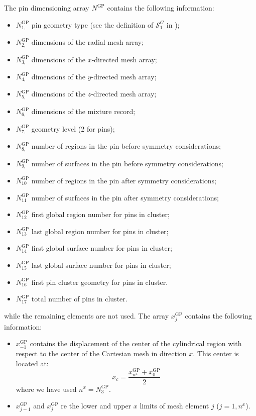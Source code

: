 The pin dimensioning array $N^{\text{GP}}$ contains the following information:
\begin{itemize}
\item $N^{\text{GP}}_{1,}$ pin geometry type (see the definition of $\mathcal{S}^{G}_{1}$ in );
\item $N^{\text{GP}}_{2,}$ dimensions of the radial mesh array;
\item $N^{\text{GP}}_{3,}$ dimensions of the $x$-directed mesh array;  
\item $N^{\text{GP}}_{4,}$ dimensions of the $y$-directed mesh array;  
\item $N^{\text{GP}}_{5,}$ dimensions of the $z$-directed mesh array;  
\item $N^{\text{GP}}_{6,}$ dimensions of the mixture record;
\item $N^{\text{GP}}_{7,}$ geometry level (2 for pins);
\item $N^{\text{GP}}_{8,}$ number of regions in the pin before symmetry considerations;
\item $N^{\text{GP}}_{9,}$ number of surfaces in the pin before symmetry considerations;
\item $N^{\text{GP}}_{10}$ number of regions in the pin after symmetry considerations;
\item $N^{\text{GP}}_{11}$ number of surfaces in the pin after symmetry considerations;
\item $N^{\text{GP}}_{12}$ first global region number for pins in cluster;
\item $N^{\text{GP}}_{13}$ last global region number for pins in cluster;
\item $N^{\text{GP}}_{14}$ first global surface number for pins in cluster;
\item $N^{\text{GP}}_{15}$ last global surface number for pins in cluster;
\item $N^{\text{GP}}_{16}$ first pin cluster geometry for pins in cluster.
\item $N^{\text{GP}}_{17}$ total number of pins in cluster.
\end{itemize}
while the remaining elements are not used. 
The array $x^{\text{GP}}_{j}$ contains the following information:
\begin{itemize}
\item $x^{\text{GP}}_{-1}$ contains the displacement of the center of the cylindrical region with respect to the center of the Cartesian mesh in direction $x$. This
center is located at:
$$
x_{c}=\frac{x^{\text{GP}}_{n^{x}}+x^{\text{GP}}_{0}}{2}
$$
where we have used $n^{x}=N^{\text{GP}}_{3}$.
\item $x^{\text{GP}}_{j-1}$ and $x^{\text{GP}}_{j}$ re the lower and upper $x$ limits of mesh element $j$ ($j=1,n^{x}$).
\end{itemize}
